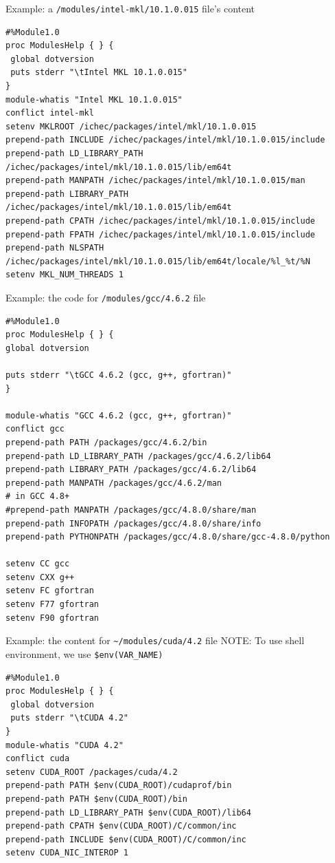 Example: a \verb!/modules/intel-mkl/10.1.0.015!
file's content
\begin{verbatim}
#%Module1.0
proc ModulesHelp { } {
 global dotversion
 puts stderr "\tIntel MKL 10.1.0.015"
}
module-whatis "Intel MKL 10.1.0.015"
conflict intel-mkl
setenv MKLROOT /ichec/packages/intel/mkl/10.1.0.015
prepend-path INCLUDE /ichec/packages/intel/mkl/10.1.0.015/include
prepend-path LD_LIBRARY_PATH /ichec/packages/intel/mkl/10.1.0.015/lib/em64t
prepend-path MANPATH /ichec/packages/intel/mkl/10.1.0.015/man
prepend-path LIBRARY_PATH /ichec/packages/intel/mkl/10.1.0.015/lib/em64t
prepend-path CPATH /ichec/packages/intel/mkl/10.1.0.015/include
prepend-path FPATH /ichec/packages/intel/mkl/10.1.0.015/include
prepend-path NLSPATH /ichec/packages/intel/mkl/10.1.0.015/lib/em64t/locale/%l_%t/%N
setenv MKL_NUM_THREADS 1
\end{verbatim}

Example: the code for \verb!/modules/gcc/4.6.2! file
\begin{verbatim}
#%Module1.0
proc ModulesHelp { } {
global dotversion
 
puts stderr "\tGCC 4.6.2 (gcc, g++, gfortran)"
}
 
module-whatis "GCC 4.6.2 (gcc, g++, gfortran)"
conflict gcc
prepend-path PATH /packages/gcc/4.6.2/bin
prepend-path LD_LIBRARY_PATH /packages/gcc/4.6.2/lib64
prepend-path LIBRARY_PATH /packages/gcc/4.6.2/lib64
prepend-path MANPATH /packages/gcc/4.6.2/man
# in GCC 4.8+
#prepend-path MANPATH /packages/gcc/4.8.0/share/man                       
prepend-path INFOPATH /packages/gcc/4.8.0/share/info
prepend-path PYTHONPATH /packages/gcc/4.8.0/share/gcc-4.8.0/python
       
setenv CC gcc
setenv CXX g++
setenv FC gfortran
setenv F77 gfortran
setenv F90 gfortran
\end{verbatim}

Example: the content for \verb!~/modules/cuda/4.2! file
NOTE: To use shell environment, we use \verb!$env(VAR_NAME)! 

\begin{verbatim}
#%Module1.0
proc ModulesHelp { } {
 global dotversion
 puts stderr "\tCUDA 4.2"
}
module-whatis "CUDA 4.2"
conflict cuda
setenv CUDA_ROOT /packages/cuda/4.2
prepend-path PATH $env(CUDA_ROOT)/cudaprof/bin
prepend-path PATH $env(CUDA_ROOT)/bin
prepend-path LD_LIBRARY_PATH $env(CUDA_ROOT)/lib64
prepend-path CPATH $env(CUDA_ROOT)/C/common/inc
prepend-path INCLUDE $env(CUDA_ROOT)/C/common/inc
setenv CUDA_NIC_INTEROP 1
\end{verbatim}

